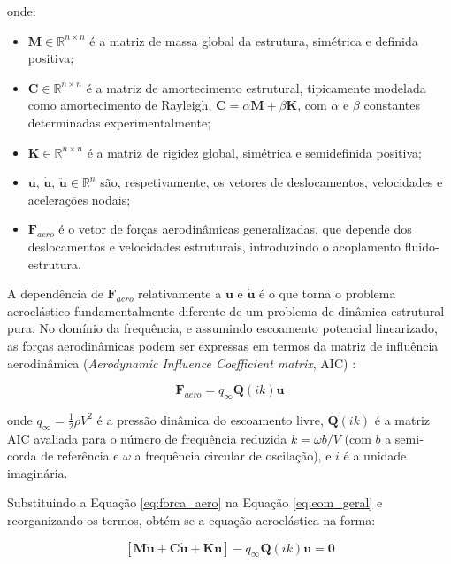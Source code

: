 \documentclass[11pt,twoside,a4paper]{report}
\begin{document}
\noindent onde:
\begin{itemize}
    \item $\mathbf{M} \in \mathbb{R}^{n \times n}$ é a matriz de massa global da estrutura, simétrica e definida positiva;
    \item $\mathbf{C} \in \mathbb{R}^{n \times n}$ é a matriz de amortecimento estrutural, tipicamente modelada como amortecimento de Rayleigh, $\mathbf{C} = \alpha \mathbf{M} + \beta \mathbf{K}$, com $\alpha$ e $\beta$ constantes determinadas experimentalmente;
    \item $\mathbf{K} \in \mathbb{R}^{n \times n}$ é a matriz de rigidez global, simétrica e semidefinida positiva;
    \item $\mathbf{u}$, $\dot{\mathbf{u}}$, $\ddot{\mathbf{u}} \in 
    \mathbb{R}^{n}$ são, respetivamente, os vetores de deslocamentos, velocidades e acelerações nodais;
    \item $\mathbf{F}_{aero}$ é o vetor de forças aerodinâmicas generalizadas, que depende dos deslocamentos e velocidades estruturais, introduzindo o acoplamento fluido-estrutura.
\end{itemize}

A dependência de $\mathbf{F}_{aero}$ relativamente a $\mathbf{u}$ e $\dot{\mathbf{u}}$ é o que torna o problema aeroelástico fundamentalmente diferente de um problema de dinâmica estrutural pura. No domínio da frequência, e assumindo escoamento potencial linearizado, as forças aerodinâmicas podem ser expressas em termos da matriz de influência aerodinâmica (\textit{Aerodynamic Influence Coefficient matrix}, AIC) \cite{Roger1977}:

\begin{equation}
    \mathbf{F}_{aero} = q_\infty \mathbf{Q}(ik) \mathbf{u}
    \label{eq:forca_aero}
\end{equation}

\noindent onde $q_\infty = \frac{1}{2}\rho V^2$ é a pressão dinâmica do escoamento livre, $\mathbf{Q}(ik)$ é a matriz AIC avaliada para o número de frequência reduzida $k = \omega b / V$ (com $b$ a semi-corda de referência e $\omega$ a frequência circular de oscilação), e $i$ é a unidade imaginária.

Substituindo a Equação \eqref{eq:forca_aero} na Equação \eqref{eq:eom_geral} e reorganizando os termos, obtém-se a equação aeroelástica na forma:

\begin{equation}
    \left[ \mathbf{M}\ddot{\mathbf{u}} + \mathbf{C}\dot{\mathbf{u}} + 
    \mathbf{K}\mathbf{u} \right] - q_\infty \mathbf{Q}(ik)\mathbf{u} 
    = \mathbf{0}
    \label{eq:flutter_eq}
\end{equation}
\end{document}
